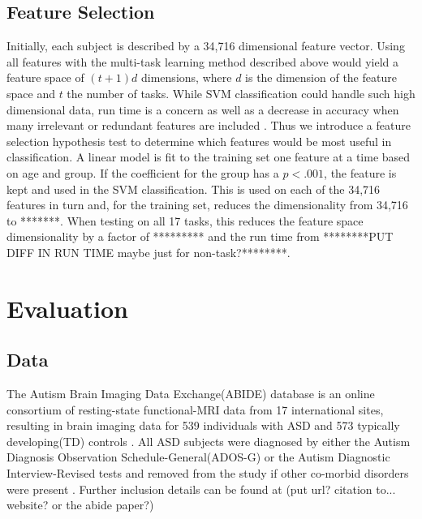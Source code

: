 \documentclass{llncs}
\begin{document}
\subsection{Feature Selection}
\label{subsec:FS}
Initially, each subject is described by a 34,716 dimensional feature vector.  Using all features with the multi-task learning method described above would yield a feature space of $(t+1)d$ dimensions, where $d$ is the dimension of the feature space and $t$ the number of tasks.  While SVM classification could handle such high dimensional data, run time is a concern as well as a decrease in accuracy when many irrelevant or redundant features are included \cite{featsel}.  Thus we introduce a feature selection hypothesis test to determine which features would be most useful in classification.  A linear model is fit to the training set one feature at a time based on age and group. If the coefficient for the group  has a $p < .001$, the feature is kept and used in the SVM classification. This is used on each of the 34,716 features in turn and, for the training set, reduces the dimensionality from 34,716 to   *******.  When testing on all 17 tasks, this reduces the feature space dimensionality by a factor of ********* and the run time from ********PUT DIFF IN RUN TIME maybe just for non-task?********. 
\section{Evaluation}
\subsection{Data}
The Autism Brain Imaging Data Exchange(ABIDE) database is an online consortium of resting-state functional-MRI data from 17 international sites, resulting in brain imaging data for 539 individuals with ASD and 573 typically developing(TD)  controls \cite{abide}. All ASD subjects were diagnosed by either the Autism Diagnosis Observation Schedule-General(ADOS-G) or the Autism Diagnostic Interview-Revised tests and removed from the study if other co-morbid disorders were present \cite{lordADOS} \cite{lordADIR} \cite{abide}.  Further inclusion details can be found at (put url? citation to... website? or the abide paper?)
\end{document}
